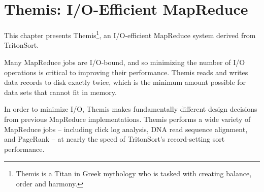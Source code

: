 \chapter{Themis: I/O-Efficient MapReduce}
\label{chapter:themis}

This chapter presents Themis\footnote{Themis is a Titan in Greek mythology who
  is tasked with creating balance, order and harmony.}, an I/O-efficient
MapReduce system derived from TritonSort.

Many MapReduce jobs are I/O-bound, and so minimizing the number of I/O
operations is critical to improving their performance. Themis reads and writes
data records to disk exactly twice, which is the minimum amount possible for
data sets that cannot fit in memory.

In order to minimize I/O, Themis makes fundamentally different design decisions
from previous MapReduce implementations. Themis performs a wide variety of
MapReduce jobs -- including click log analysis, DNA read sequence alignment,
and PageRank -- at nearly the speed of TritonSort's record-setting sort
performance.







